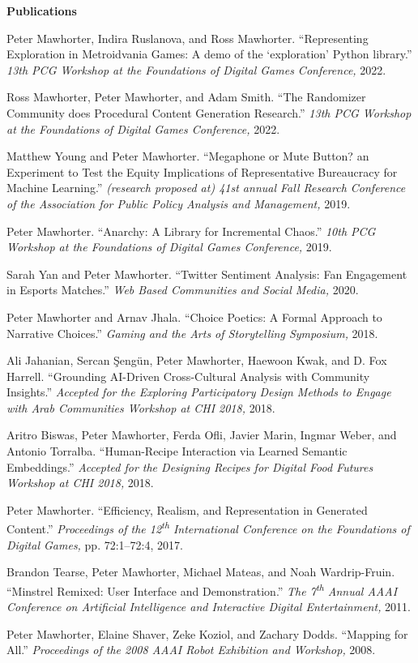 \documentclass[11pt]{article}
\newenvironment{pubs}[1]{%
  \vspace{8pt}\textbf{\Large #1} \hrulefill\vspace{6pt}
  \begin{adjustwidth}{14pt}{0pt}
  \setlength{\parskip}{4pt}
  \setlength{\parindent}{-8pt}
}{%
  \end{adjustwidth}
}
\newcommand{\fullpub}[5]{%
\begin{samepage}
#1. ``#2.'' \textit{#3,} #4, #5.

\end{samepage}%
}
\newcommand{\nppub}[4]{%
\begin{samepage}
#1. ``#2.'' \textit{#3,} #4.

\end{samepage}%
}
\newcommand{\tsup}[1]{\textsuperscript{#1}}
\begin{document}
\begin{pubs}{Publications}
\nppub{Peter Mawhorter, Indira Ruslanova, and Ross Mawhorter}{Representing Exploration in Metroidvania Games: A demo of the `exploration' Python library}{13th PCG Workshop at the Foundations of Digital Games Conference}{2022}

\nppub{Ross Mawhorter, Peter Mawhorter, and Adam Smith}{The Randomizer Community does Procedural Content Generation Research}{13th PCG Workshop at the Foundations of Digital Games Conference}{2022}

\nppub{Matthew Young and Peter Mawhorter}{Megaphone or Mute Button? an Experiment to Test the Equity Implications of Representative Bureaucracy for Machine Learning}{(research proposed at) 41st annual Fall Research Conference of the Association for Public Policy Analysis and Management}{2019}

\nppub{Peter Mawhorter}{Anarchy: A Library for Incremental Chaos}{10th PCG Workshop at the Foundations of Digital Games Conference}{2019}

\nppub{Sarah Yan and Peter Mawhorter}{Twitter Sentiment Analysis: Fan Engagement in Esports Matches}{Web Based Communities and Social Media}{2020}

\nppub{Peter Mawhorter and Arnav Jhala}{Choice Poetics: A Formal Approach to Narrative Choices}{Gaming and the Arts of Storytelling Symposium}{2018}

\nppub{Ali Jahanian, Sercan Şengün, Peter Mawhorter, Haewoon Kwak, and D. Fox Harrell}{Grounding AI-Driven Cross-Cultural Analysis with Community Insights}{Accepted for the Exploring Participatory Design Methods to Engage with Arab Communities Workshop at CHI 2018}{2018}

\nppub{Aritro Biswas, Peter Mawhorter, Ferda Ofli, Javier Marin, Ingmar Weber, and Antonio Torralba}{Human-Recipe Interaction via Learned Semantic Embeddings}{Accepted for the Designing Recipes for Digital Food Futures Workshop at CHI 2018}{2018}

\fullpub{Peter Mawhorter}{Efficiency, Realism, and Representation in Generated Content}{Proceedings of the 12\tsup{th} International Conference on the Foundations of Digital Games}{pp. 72:1--72:4}{2017}

\nppub{Brandon Tearse, Peter Mawhorter, Michael Mateas, and Noah Wardrip-Fruin}{Minstrel Remixed: User Interface and Demonstration}{The 7\tsup{th} Annual AAAI Conference on Artificial Intelligence and Interactive Digital Entertainment}{2011}

\nppub{Peter Mawhorter, Elaine Shaver, Zeke Koziol, and Zachary Dodds}{Mapping for All}{Proceedings of the 2008 AAAI Robot Exhibition and Workshop}{2008}

\end{pubs}
\end{document}
